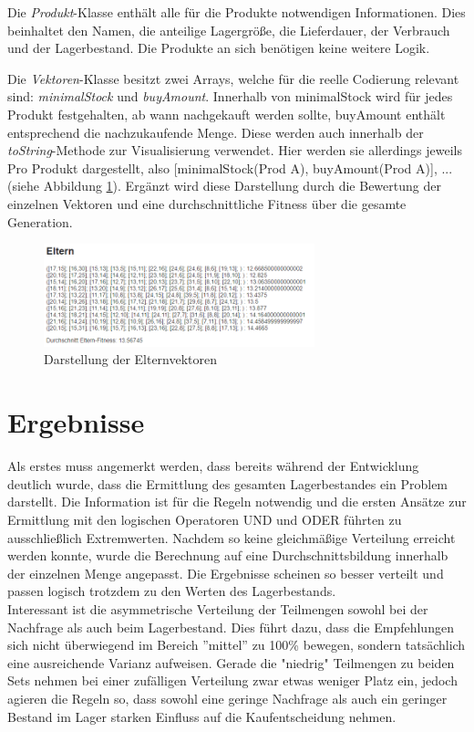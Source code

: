 \documentclass[]{scrartcl}
\begin{document}
Die \textit{Produkt}-Klasse enthält alle für die Produkte notwendigen Informationen. Dies beinhaltet den Namen, die anteilige Lagergröße, die Lieferdauer, der Verbrauch und der Lagerbestand. Die Produkte an sich benötigen keine weitere Logik.

Die \textit{Vektoren}-Klasse besitzt zwei Arrays, welche für die reelle Codierung relevant sind: \textit{minimalStock} und \textit{buyAmount}. Innerhalb von minimalStock wird für jedes Produkt festgehalten, ab wann nachgekauft werden sollte, buyAmount enthält entsprechend die nachzukaufende Menge. Diese werden auch innerhalb der \textit{toString}-Methode zur Visualisierung verwendet. Hier werden sie allerdings jeweils Pro Produkt dargestellt, also [minimalStock(Prod A), buyAmount(Prod A)], ... (siehe Abbildung \ref{img:vektoren}). Ergänzt wird diese Darstellung durch die Bewertung der einzelnen Vektoren und eine durchschnittliche Fitness über die gesamte Generation.

\begin{figure}[htbp]
	\centering
	\includegraphics[width=0.7\textwidth]{res/vektoren.png}
	\caption{Darstellung der Elternvektoren}
	\label{img:vektoren}
\end{figure}



\section{Ergebnisse}
\label{ergebnisse}
Als erstes muss angemerkt werden, dass bereits während der Entwicklung deutlich wurde, dass die Ermittlung des gesamten Lagerbestandes ein Problem darstellt. Die Information ist für die Regeln notwendig und die ersten Ansätze zur Ermittlung mit den logischen Operatoren UND und ODER führten zu ausschließlich Extremwerten. Nachdem so keine gleichmäßige Verteilung erreicht werden konnte, wurde die Berechnung auf eine Durchschnittsbildung innerhalb der einzelnen Menge angepasst. Die Ergebnisse  scheinen so besser verteilt und passen logisch trotzdem zu den Werten des Lagerbestands.
\\

Interessant ist die asymmetrische Verteilung der Teilmengen sowohl bei der Nachfrage als auch beim Lagerbestand. Dies führt dazu, dass die Empfehlungen sich nicht überwiegend im Bereich ''mittel'' zu 100\% bewegen, sondern tatsächlich eine ausreichende Varianz aufweisen. Gerade die "niedrig" Teilmengen zu beiden Sets nehmen bei einer zufälligen Verteilung zwar etwas weniger Platz ein, jedoch agieren die Regeln so, dass sowohl eine geringe Nachfrage als auch ein geringer Bestand im Lager starken Einfluss auf die Kaufentscheidung nehmen.
\\
\end{document}
